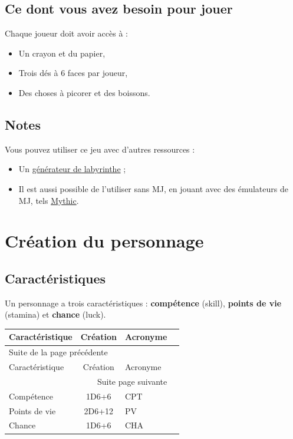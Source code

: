 \documentclass[a4paper, 11pt, twoside]{article}
\begin{document}
\subsection{Ce dont vous avez besoin pour jouer}
\label{sec:org81187d2}

Chaque joueur doit avoir accès à :
\begin{itemize}
\item Un crayon et du papier,
\item Trois dés à 6 faces par joueur,
\item Des choses à picorer et des boissons.
\end{itemize}

\subsection{Notes}
\label{sec:orgb1e9c8d}

Vous pouvez utiliser ce jeu avec d'autres ressources :
\begin{itemize}
\item Un \href{https://github.com/orey/jdr/tree/master/G\%25C3\%25A9n\%25C3\%25A9rateurLabyrinthe}{générateur de labyrinthe} ;
\item Il est aussi possible de l'utiliser sans MJ, en jouant avec des émulateurs de MJ, tels \href{https://github.com/orey/jdr/tree/master/Mythic-fr}{Mythic}.
\end{itemize}

\section{Création du personnage}
\label{sec:org55443a5}

\subsection{Caractéristiques}
\label{sec:orgfd92860}

Un personnage a trois caractéristiques : \textbf{compétence} (skill), \textbf{points de vie} (stamina)  et \textbf{chance} (luck).

\begin{longtable}{l|c|l|c}
Caractéristique & Création & Acronyme\\
\hline
\endfirsthead
\multicolumn{3}{l}{Suite de la page précédente} \\
\hline

Caractéristique & Création & Acronyme \\

\hline
\endhead
\hline\multicolumn{3}{r}{Suite page suivante} \\
\endfoot
\endlastfoot
\hline
Compétence & 1D6+6 & CPT\\
Points de vie & 2D6+12 & PV\\
Chance & 1D6+6 & CHA\\
\end{longtable}
\end{document}
